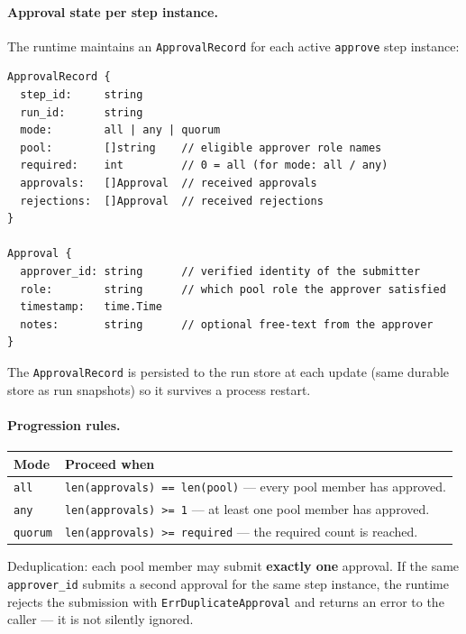 \paragraph{Approval state per step instance.}
The runtime maintains an \texttt{ApprovalRecord} for each active \texttt{approve} step
instance:

\begin{verbatim}
ApprovalRecord {
  step_id:     string
  run_id:      string
  mode:        all | any | quorum
  pool:        []string    // eligible approver role names
  required:    int         // 0 = all (for mode: all / any)
  approvals:   []Approval  // received approvals
  rejections:  []Approval  // received rejections
}

Approval {
  approver_id: string      // verified identity of the submitter
  role:        string      // which pool role the approver satisfied
  timestamp:   time.Time
  notes:       string      // optional free-text from the approver
}
\end{verbatim}

The \texttt{ApprovalRecord} is persisted to the run store at each update (same durable
store as run snapshots) so it survives a process restart.

\paragraph{Progression rules.}

\begin{center}
\begin{tabular}{|l|p{9cm}|}
\hline
\textbf{Mode} & \textbf{Proceed when} \\
\hline
\texttt{all}    & \texttt{len(approvals) == len(pool)} — every pool member has approved. \\
\hline
\texttt{any}    & \texttt{len(approvals) >= 1} — at least one pool member has approved. \\
\hline
\texttt{quorum} & \texttt{len(approvals) >= required} — the required count is reached. \\
\hline
\end{tabular}
\end{center}

Deduplication: each pool member may submit \textbf{exactly one} approval. If the same
\texttt{approver\_id} submits a second approval for the same step instance, the runtime
rejects the submission with \texttt{ErrDuplicateApproval} and returns an error to the
caller — it is not silently ignored.

